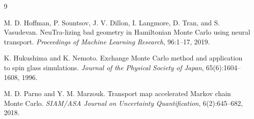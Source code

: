 \documentclass[11pt]{article}
\theoremstyle{definition}
\theoremstyle{remark}
\newcommand{\1}{\mathbf{1}}
\begin{document}
\begin{thebibliography}{9}

M. D. Hoffman, P. Sountsov, J. V. Dillon, I. Langmore, D. Tran, and
S. Vasudevan.
\newblock NeuTra-lizing bad geometry in Hamiltonian Monte Carlo using neural
transport.
\newblock \emph{Proceedings of Machine Learning Research}, 96:1--17, 2019.

K. Hukushima and K. Nemoto.
\newblock Exchange Monte Carlo method and application to spin glass
simulations.
\newblock \emph{Journal of the Physical Society of Japan}, 65(6):1604--1608,
1996.

M. D. Parno and Y. M. Marzouk.
\newblock Transport map accelerated Markov chain Monte Carlo.
\newblock \emph{SIAM/ASA Journal on Uncertainty Quantification}, 6(2):645--682,
2018.

\end{thebibliography}
\end{document}
